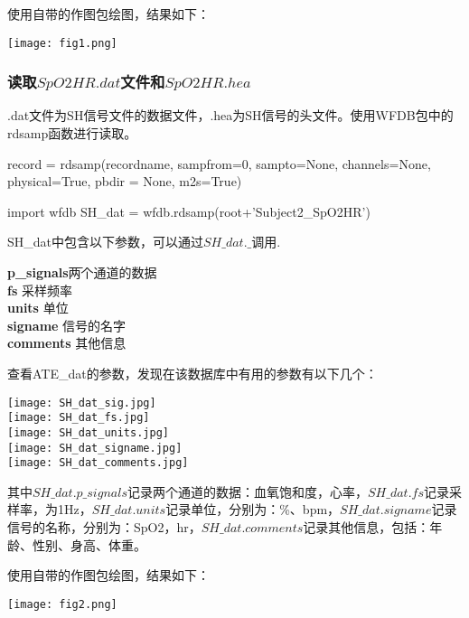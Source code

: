 \documentclass[UTF8]{ctexart}
\begin{document}
使用自带的作图包绘图，结果如下：
\begin{center} 
\texttt{[image: fig1.png]}\\
\end{center}
\subsubsection{读取$SpO2HR.dat$文件和$SpO2HR.hea$}
.dat文件为SH信号文件的数据文件，.hea为SH信号的头文件。使用WFDB包中的rdsamp函数进行读取。
\begin{thm}
record = rdsamp(recordname, sampfrom=0, sampto=None, channels=None,
physical=True, pbdir = None, m2s=True)
\end{thm}
\begin{python}
import wfdb
SH\_dat = wfdb.rdsamp(root+'Subject2_SpO2HR')
\end{python}
SH\_dat中包含以下参数，可以通过$SH\_dat.\_$调用.
\begin{tabbing}
\textbf{p\_signals}\quad\quad\quad\quad\quad\quad\= 两个通道的数据\\[5pt]
\textbf{fs}											\> 采样频率\\[5pt]
\textbf{units}											\> 单位\\[5pt]
\textbf{signame}										\> 信号的名字\\[5pt]
\textbf{comments}											\> 其他信息\\
\end{tabbing}
查看ATE\_dat的参数，发现在该数据库中有用的参数有以下几个：
\begin{center} 
\texttt{[image: SH\_dat\_sig.jpg]}\\
\vspace{3mm}
\texttt{[image: SH\_dat\_fs.jpg]}\\
\vspace{3mm}
\texttt{[image: SH\_dat\_units.jpg]}\\
\vspace{3mm}
\texttt{[image: SH\_dat\_signame.jpg]}\\
\vspace{3mm}
\texttt{[image: SH\_dat\_comments.jpg]}\\ 
\end{center}
其中$SH\_dat.p\_signals$记录两个通道的数据：血氧饱和度，心率，$SH\_dat.fs$记录采样率，为1Hz，$SH\_dat.units$记录单位，分别为：\%、bpm，$SH\_dat.signame$记录信号的名称，分别为：SpO2，hr，$SH\_dat.comments$记录其他信息，包括：年龄、性别、身高、体重。

使用自带的作图包绘图，结果如下：
\begin{center} 
\texttt{[image: fig2.png]}\\
\end{center}
\end{document}
